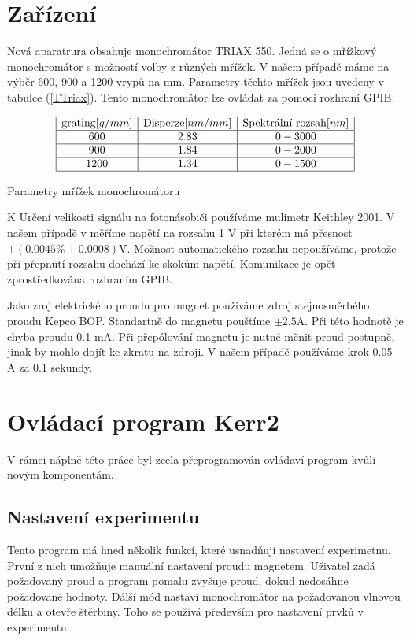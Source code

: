 \section{Zařízení}
Nová aparatrura obsahuje monochromátor TRIAX 550. Jedná se o mřížkový monochromátor s možností volby z různých mřížek. V našem případě máme na výběr 600, 900 a 1200 vrypů na mm. Parametry těchto mřížek jsou uvedeny v tabulce (\ref{TTriax}). Tento monochromátor lze ovládat za pomoci rozhraní GPIB. 
\begin{table}
$$
\begin{array}{|c|c|c|}
\hline
\mbox{grating} [g/mm]&  \mbox{Disperze} [nm/mm]&    \mbox{Spektrální rozsah} [nm] \\ \hline
600&    2.83&   0 - 3000 \\ \hline
900&    1.84&   0 - 2000 \\ \hline
1200&   1.34&   0 - 1500 \\ \hline
\end{array}
$$
\caption{Parametry mřížek monochromátoru}
\label{TTriax}
\end{table}

K Určení velikosti signálu na fotonásobiči používáme mulimetr Keithley 2001. V našem případě v měříme napětí na rozsahu 1 V při kterém má přesnost $\pm(0.0045\%+0.0008)$V. Možnost automatického rozsahu nepoužíváme, protože při přepnutí rozsahu dochází ke skokům napětí. Komunikace je opět zprostředkována rozhraním GPIB.

Jako zroj elektrického proudu pro magnet používáme zdroj stejnosměrbého proudu Kepco BOP. Standartně do magnetu pouštíme $\pm 2.5$A. Při této hodnotě je chyba proudu 0.1 mA. Při přepólování magnetu je nutné měnit proud postupně, jinak by mohlo dojít ke zkratu na zdroji. V našem případě používáme krok 0.05 A za 0.1 sekundy.

\section{Ovládací program Kerr2}
V rámci náplně této práce byl zcela přeprogramován ovládaví program kvůli novým komponentám.

\subsection{Nastavení experimentu}
Tento program má hned několik funkcí, které usnadňují nastavení experimetnu. První z nich umožňuje manuální nastavení proudu magnetem. Uživatel zadá požadovaný proud a program pomalu zvyšuje proud, dokud nedosáhne požadované hodnoty. Dálší mód nastaví monochromátor na požadovanou vlnovou délku a otevře štěrbiny. Toho se používá především pro nastavení prvků v experimentu.

